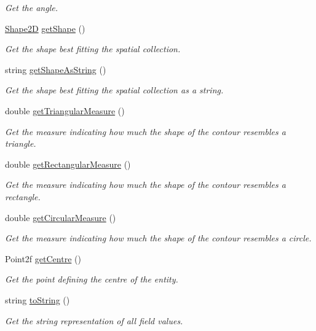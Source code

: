 \begin{DoxyCompactItemize}
\begin{DoxyCompactList}\small\item\em Get the angle. \end{DoxyCompactList}\item 
\hyperlink{namespacemultiscale_1_1analysis_ad1ef6155ab2e954c1c33d3e2e6b53fbf}{Shape2\-D} \hyperlink{classmultiscale_1_1analysis_1_1SpatialEntityPseudo3D_af67de0727472a72bad311e71db8a1115}{get\-Shape} ()
\begin{DoxyCompactList}\small\item\em Get the shape best fitting the spatial collection. \end{DoxyCompactList}\item 
string \hyperlink{classmultiscale_1_1analysis_1_1SpatialEntityPseudo3D_aaf8b45d68041be0f293eaf1bf40c76d3}{get\-Shape\-As\-String} ()
\begin{DoxyCompactList}\small\item\em Get the shape best fitting the spatial collection as a string. \end{DoxyCompactList}\item 
double \hyperlink{classmultiscale_1_1analysis_1_1SpatialEntityPseudo3D_a9c7af7e1fc6a829c184c85baeaf1ebc2}{get\-Triangular\-Measure} ()
\begin{DoxyCompactList}\small\item\em Get the measure indicating how much the shape of the contour resembles a triangle. \end{DoxyCompactList}\item 
double \hyperlink{classmultiscale_1_1analysis_1_1SpatialEntityPseudo3D_a924e390a408a91abf394f29bec33d945}{get\-Rectangular\-Measure} ()
\begin{DoxyCompactList}\small\item\em Get the measure indicating how much the shape of the contour resembles a rectangle. \end{DoxyCompactList}\item 
double \hyperlink{classmultiscale_1_1analysis_1_1SpatialEntityPseudo3D_a71759aa55f43ac2a6cc52b738f3b2c42}{get\-Circular\-Measure} ()
\begin{DoxyCompactList}\small\item\em Get the measure indicating how much the shape of the contour resembles a circle. \end{DoxyCompactList}\item 
Point2f \hyperlink{classmultiscale_1_1analysis_1_1SpatialEntityPseudo3D_a4976534b2cdf55541701a7d5ea4ac0c5}{get\-Centre} ()
\begin{DoxyCompactList}\small\item\em Get the point defining the centre of the entity. \end{DoxyCompactList}\item 
string \hyperlink{classmultiscale_1_1analysis_1_1SpatialEntityPseudo3D_abea1af0695f6f1a977b0caa3428fc433}{to\-String} ()
\begin{DoxyCompactList}\small\item\em Get the string representation of all field values. \end{DoxyCompactList}\end{DoxyCompactItemize}
